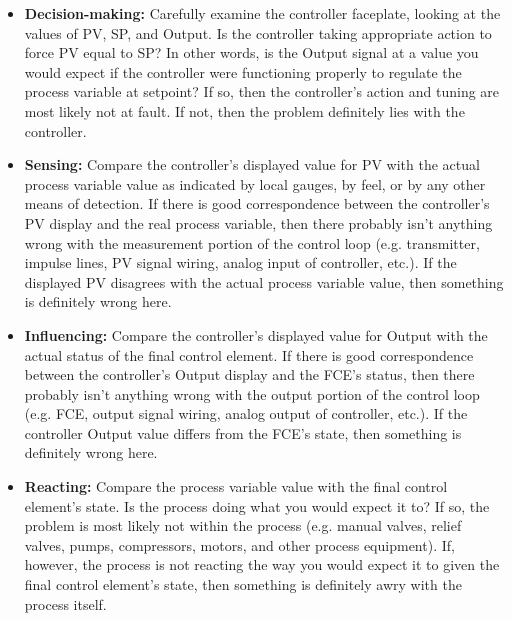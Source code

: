 \begin{itemize}
\item \textbf{Decision-making:} Carefully examine the controller faceplate, looking at the values of PV, SP, and Output.  Is the controller taking appropriate action to force PV equal to SP?  In other words, is the Output signal at a value you would expect if the controller were functioning properly to regulate the process variable at setpoint?  If so, then the controller's action and tuning are most likely not at fault.  If not, then the problem definitely lies with the controller.
\item \textbf{Sensing:} Compare the controller's displayed value for PV with the actual process variable value as indicated by local gauges, by feel, or by any other means of detection.  If there is good correspondence between the controller's PV display and the real process variable, then there probably isn't anything wrong with the measurement portion of the control loop (e.g. transmitter, impulse lines, PV signal wiring, analog input of controller, etc.).  If the displayed PV disagrees with the actual process variable value, then something is definitely wrong here.
\item \textbf{Influencing:} Compare the controller's displayed value for Output with the actual status of the final control element.  If there is good correspondence between the controller's Output display and the FCE's status, then there probably isn't anything wrong with the output portion of the control loop (e.g. FCE, output signal wiring, analog output of controller, etc.).  If the controller Output value differs from the FCE's state, then something is definitely wrong here.
\item \textbf{Reacting:} Compare the process variable value with the final control element's state.  Is the process doing what you would expect it to?  If so, the problem is most likely not within the process (e.g. manual valves, relief valves, pumps, compressors, motors, and other process equipment).  If, however, the process is not reacting the way you would expect it to given the final control element's state, then something is definitely awry with the process itself.
\end{itemize}













